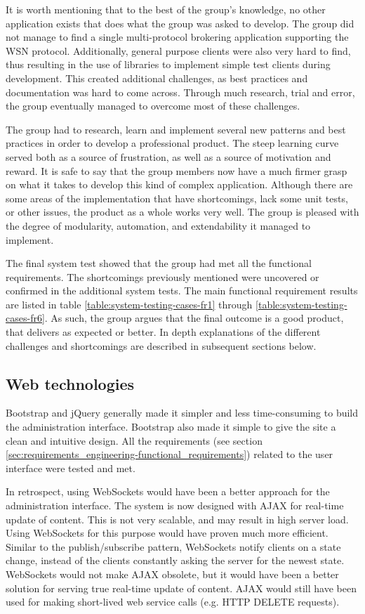 It is worth mentioning that to the best of the group's knowledge, no other application exists that does what the group was asked to develop. The group did not manage to find a single multi-protocol brokering application supporting the WSN protocol. Additionally, general purpose clients were also very hard to find, thus resulting in the use of libraries to implement simple test clients during development. This created additional challenges, as best practices and documentation was hard to come across. Through much research, trial and error, the group eventually managed to overcome most of these challenges.

The group had to research, learn and implement several new patterns and best practices in order to develop a professional product. The steep learning curve served both as a source of frustration, as well as a source of motivation and reward. It is safe to say that the group members now have a much firmer grasp on what it takes to develop this kind of complex application. Although there are some areas of the implementation that have shortcomings, lack some unit tests, or other issues, the product as a whole works very well. The group is pleased with the degree of modularity, automation, and extendability it managed to implement.

The final system test showed that the group had met all the functional requirements. The shortcomings previously mentioned were uncovered or confirmed in the additional system tests. The main functional requirement results are listed in table \ref{table:system-testing-cases-fr1} through \ref{table:system-testing-cases-fr6}. As such, the group argues that the final outcome is a good product, that delivers as expected or better.
In depth explanations of the different challenges and shortcomings are described in subsequent sections below.

\subsection{Web technologies}
\label{subsec:Web_technologies}

Bootstrap and jQuery generally made it simpler and less time-consuming to build the administration interface. Bootstrap also made it simple to give the site a clean and intuitive design. All the requirements (see section \ref{sec:requirements_engineering-functional_requirements}) related to the user interface were tested and met.

In retrospect, using WebSockets \cite{web-sockets} would have been a better approach for the administration interface. The system is now designed with AJAX for real-time update of content. This is not very scalable, and may result in high server load. Using WebSockets for this purpose would have proven much more efficient. Similar to the publish/subscribe pattern, WebSockets notify clients on a state change, instead of the clients constantly asking the server for the newest state. WebSockets would not make AJAX obsolete, but it would have been a better solution for serving true real-time update of content. AJAX would still have been used for making short-lived web service calls (e.g. HTTP DELETE requests).

